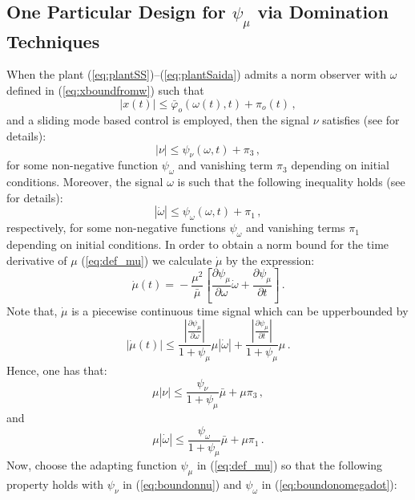 \documentclass[letterpaper, 10 pt, journal, twocolumn]{IEEEtran}  %
\theoremstyle{plain}
\theoremstyle{definition}
\theoremstyle{remark}
\begin{document}
\subsection{One Particular Design for $\psi_\mu$ via Domination Techniques}

When the plant (\ref{eq:plantSS})--(\ref{eq:plantSaida}) admits a norm observer with $\omega$ defined in (\ref{eq:xboundfromw}) such that 
%
\begin{equation}
|x(t)| \leq \bar{\varphi}_o(\omega(t),t) + \pi_o(t)\,,\label{eq:xboundfromw1}
\end{equation}
%
and a sliding mode based control is employed, then the signal $\nu$ satisfies (see \cite{POH:2011} for details):
%
\begin{equation}
|\nu| \leq \psi_\nu(\omega,t)+\pi_3\,,\label{eq:boundonnu}
\end{equation}
%
for some non-negative function $\psi_\omega$ and vanishing term $\pi_3$ depending on  initial conditions.  Moreover, the signal $\omega$ is such that the following inequality holds (see \cite{POH:2011} for details):
%
\begin{equation}\label{eq:boundonomegadot}
\left|\dot{\omega}\right| \leq \psi_\omega(\omega,t)+\pi_1\,,
\end{equation}
%
respectively, for some non-negative functions $\psi_\omega$  and vanishing terms $\pi_1$ depending on  initial conditions. 
%
In order to obtain a norm bound for the time derivative of $\mu$
(\ref{eq:def_mu}) we calculate $\dot{\mu}$ by the expression:
%
\begin{equation}
\dot{\mu}(t)\!=\!-\frac{\mu^2}{\bar{\mu}} \left[\frac{\partial
\psi_\mu}{\partial \omega} \dot{\omega}+\frac{\partial
\psi_\mu}{\partial t}\right]\,. \label{eq:def_mudot2}
\end{equation}
%
Note that, $\dot{\mu}$ is a piecewise continuous time signal which
can be upperbounded by
%
\begin{equation}
|\dot{\mu}(t)|\!\leq\!\frac{\left|\frac{\partial
\psi_\mu}{\partial \omega}\right|}{1+\psi_\mu} \mu
|\dot{\omega}|+\frac{\left|\frac{\partial \psi_\mu}{\partial
t}\right|}{1+\psi_\mu}\mu\,. \label{eq:mudotbound}
\end{equation}
%
Hence, one has that:
%
\begin{equation}
\mu|\nu| \leq
\frac{\psi_\nu}{1+\psi_\mu}\bar{\mu}+\mu\pi_3\,,\label{eq:boundonmunu}
\end{equation}
%
and
%
\begin{equation}
\mu|\dot{\omega}| \leq
\frac{\psi_\omega}{1+\psi_\mu}\bar{\mu}+\mu\pi_1\,.\label{eq:boundonmudotomega}
\end{equation}
%
Now, choose the adapting function $\psi_\mu$ in
(\ref{eq:def_mu}) so that the following property holds with
$\psi_\nu$ in (\ref{eq:boundonnu}) and $\psi_\omega$ in
(\ref{eq:boundonomegadot}):
\end{document}
